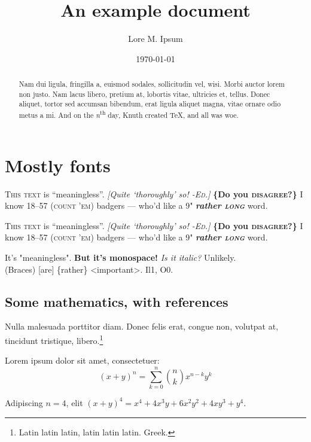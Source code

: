 \documentclass{rntz}
\title{An example document}
\author{Lore M. Ipsum}
\date{\today}
\begin{document}
\maketitle

\begin{abstract}
  Nam dui ligula, fringilla a, euismod sodales, sollicitudin vel, wisi. Morbi
  auctor lorem non justo. Nam lacus libero, pretium at, lobortis vitae,
  ultricies et, tellus. Donec aliquet, tortor sed accumsan bibendum, erat ligula
  aliquet magna, vitae ornare odio metus a mi. And on the
  \emph{n}\textsuperscript{th} day, Knuth created \TeX, and all was woe.
\end{abstract}

\section{Mostly fonts}\label{sec:one}

\newcommand{\testtext}{\textsc{This text} is ``meaningless''. \emph{[Quite
      `thoroughly' so! \textsc{-Ed.}]} {\bfseries \{Do you \textsc{disagree}?\}} I
  know 18--57 (\textsc{count 'em}) badgers --- who'd like a 9"
  {\bfseries\itshape rather \textsc{long}} word.}

\begingroup
\testtext\setlength\parskip{1em}\setlength\parindent{0em}

{\sffamily\testtext}

{\ttfamily It's "meaningless". \textbf{But it's monospace!}
  {\itshape
    Is it italic?} Unlikely.\\
  (Braces) [are] \{rather\} <important>. Il1, O0.}
\endgroup

\subsection{Some mathematics, with references}

Nulla malesuada porttitor diam. Donec felis erat, congue non,
volutpat at, tincidunt tristique, libero.\footnote{Latin latin latin, latin latin latin. Greek.}

\begin{theorem}[Binomial]\label{thm:binomial} Lorem ipsum dolor sit amet, consectetuer:
  \[ (x+y)^n = \sum_{k=0}^n \binom{n}{k} x^{n-k} y^k \]
\end{theorem}

\begin{corollary} Adipiscing $n=4$, elit
  \( (x+y)^4 = x^4 + 4x^3y + 6x^2y^2 + 4xy^3 + y^4 \).
\end{corollary}
\end{document}
